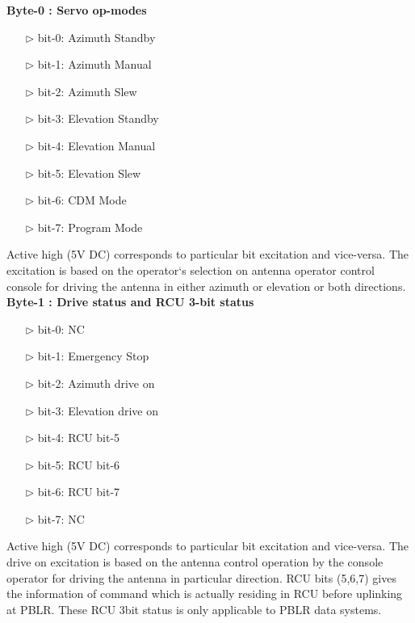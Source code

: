 \textbf{Byte-0 : Servo op-modes}
		\begin{enumerate}
		\item [$\rhd$] bit-0: Azimuth Standby
		\item [$\rhd$] bit-1: Azimuth Manual
		\item [$\rhd$] bit-2: Azimuth Slew
		\item [$\rhd$] bit-3: Elevation Standby
		\item [$\rhd$] bit-4: Elevation Manual
		\item [$\rhd$] bit-5: Elevation Slew
		\item [$\rhd$] bit-6: CDM Mode
		\item [$\rhd$] bit-7: Program Mode
		\end{enumerate}
	Active high (5V DC) corresponds to particular bit excitation and vice-versa. The excitation is based on the operator`s selection on antenna operator control console for driving the antenna in either azimuth or elevation or both directions.\\
	
	\textbf{Byte-1 : Drive status and RCU 3-bit status}
	\begin{enumerate}
		\item [$\rhd$] bit-0: NC
		\item [$\rhd$] bit-1: Emergency Stop
		\item [$\rhd$] bit-2: Azimuth drive on
		\item [$\rhd$] bit-3: Elevation drive on
		\item [$\rhd$] bit-4: RCU bit-5
		\item [$\rhd$] bit-5: RCU bit-6
		\item [$\rhd$] bit-6: RCU bit-7
		\item [$\rhd$] bit-7: NC
	\end{enumerate}
Active high (5V DC) corresponds to particular bit excitation and vice-versa. The drive on excitation is based on the antenna control operation by the console operator for driving the antenna in particular direction. RCU bits (5,6,7) gives the information of command which is actually residing in RCU before uplinking at PBLR. These RCU 3bit status is only applicable to PBLR data systems. \\

